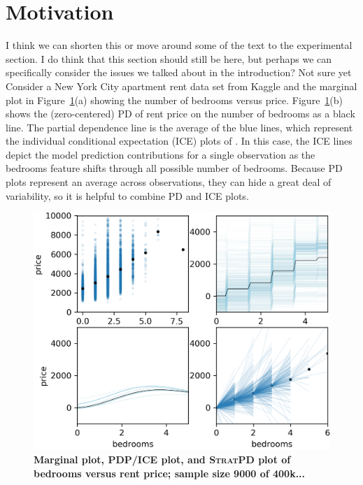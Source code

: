 \documentclass[12pt]{article}
\newcommand{\figref}[1]{Figure~\ref{#1}}
\newcommand{\cut}[1]{}
\newcommand{\spd}{\fontfamily{cmr}\textsc{\small StratPD}}
\begin{document}
\section{Motivation}\label{sec:motivation}
\cut{\cite{PDP} introduced partial dependence (PD) plots as a way to extract and visualize the dependence of the target on one or two features of interest.} {\color{red} I think we can shorten this or move around some of the text to the experimental section. I do think that this section should still be here, but perhaps we can specifically consider the issues we talked about in the introduction? Not sure yet} Consider a New York City apartment rent data set from Kaggle \cite{rent-dataset} and the marginal plot in \figref{fig:baths_price}(a) showing the number of bedrooms versus price.  \figref{fig:baths_price}(b) shows the (zero-centered) PD of rent price on the number of bedrooms as a black line. The partial dependence line is the average of the blue lines, which represent the individual conditional expectation (ICE) plots of \cite{ICE}.  In this case, the ICE lines depict the model prediction contributions for a single observation as the bedrooms feature shifts through all possible number of bedrooms. Because PD plots represent an average across observations, they can hide a great deal of variability, so it is helpful to combine PD and ICE plots.

\begin{figure}[htbp]
\begin{center}
\includegraphics[scale=0.7]{images/bedrooms_vs_price.png}
\caption{{\bf  Marginal plot, PDP/ICE plot, and \spd{} plot of bedrooms versus rent price; sample size 9000 of 400k...}}
\label{fig:baths_price}
\end{center}
\end{figure}
\end{document}
